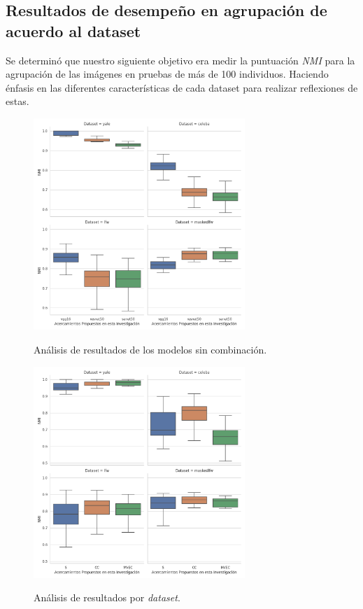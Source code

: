 \documentclass[letterpaper, 10 pt, conference]{ieeeconf}  %
\begin{document}
    \subsection{Resultados de desempeño en agrupación de acuerdo al dataset}
    Se determinó que nuestro siguiente objetivo era medir la puntuación \textit{NMI} para la
    agrupación de las imágenes en pruebas de más de 100 individuos. Haciendo énfasis en las
    diferentes características de cada dataset para realizar reflexiones de estas.

    \begin{figure}[ht]
        \centering
        \includegraphics[width=8cm]{./figs/singles.png}
        \label{fig: Results Single}
        \caption{Análisis de resultados de los modelos sin combinación.}
    \end{figure}

    \begin{figure}[ht]
        \centering
        \includegraphics[width=8cm]{./figs/dataset_comparison.png}
        \label{fig: Results Dataset}
        \caption{Análisis de resultados por \textit{dataset}.}
    \end{figure}
\end{document}
